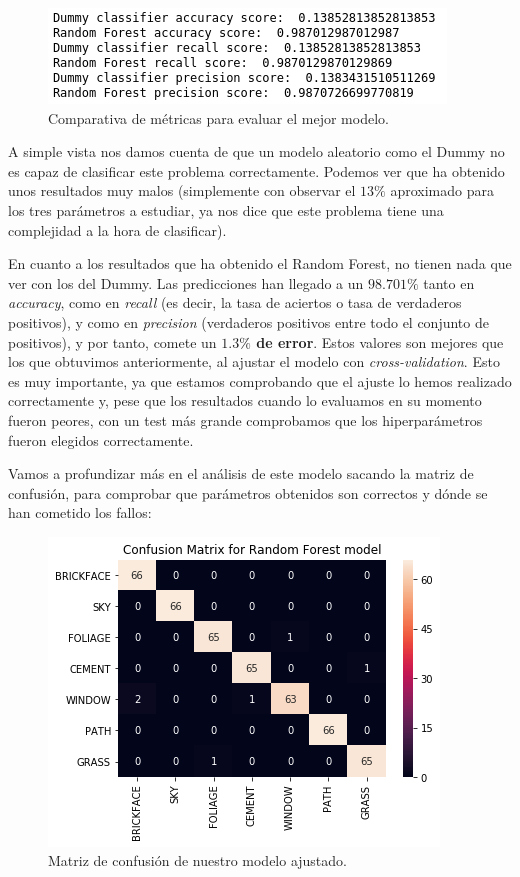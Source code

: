 \documentclass[11pt,a4paper]{article}
\begin{document}
\begin{figure}[H]
    \centering
    \includegraphics{img/model-comp-scores.png}
    \caption{Comparativa de métricas para evaluar el mejor modelo.}
    \label{fig:model-comp-scores}
\end{figure}

A simple vista nos damos cuenta de que un modelo aleatorio como el Dummy no es capaz de clasificar este problema correctamente. Podemos
ver que ha obtenido unos resultados muy malos (simplemente con observar el $13\%$ aproximado para los tres parámetros a estudiar, ya nos
dice que este problema tiene una complejidad a la hora de clasificar).

En cuanto a los resultados que ha obtenido el Random Forest, no tienen nada que ver con los del Dummy. Las predicciones han llegado a un
$98.701\%$ tanto en \textit{accuracy}, como en \textit{recall} (es decir, la tasa de aciertos o tasa de verdaderos positivos), y como en
\textit{precision} (verdaderos positivos entre todo el conjunto de positivos), y por tanto, comete un \textbf{$1.3\%$ de error}. Estos
valores son mejores que los que obtuvimos anteriormente, al ajustar el modelo con \textit{cross-validation}. Esto es muy importante, ya
que estamos comprobando que el ajuste lo hemos realizado correctamente y, pese que los resultados cuando lo evaluamos en su momento fueron
peores, con un test más grande comprobamos que los hiperparámetros fueron elegidos correctamente.

Vamos a profundizar más en el análisis de este modelo sacando la matriz de confusión, para comprobar que parámetros obtenidos son
correctos y dónde se han cometido los fallos:

\begin{figure}[H]
    \centering
    \includegraphics[scale=0.7]{img/confusion-matrix.png}
    \caption{Matriz de confusión de nuestro modelo ajustado.}
    \label{fig:confusion-matrix}
\end{figure}
\end{document}
